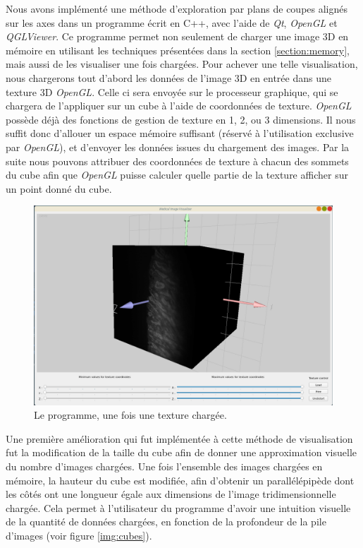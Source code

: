 {{		Nous avons implémenté une méthode d'exploration par plans de coupes alignés sur les axes dans un programme écrit en C++, avec l'aide de \textit{Qt}, \textit{OpenGL} et \textit{QGLViewer}. Ce programme permet non seulement de charger une image 3D en mémoire en utilisant les techniques présentées dans la section \ref{section:memory}, mais aussi de les visualiser une fois chargées. Pour achever une telle visualisation, nous chargerons tout d'abord les données de l'image 3D en entrée dans une texture 3D \textit{OpenGL}. Celle ci sera envoyée sur le processeur graphique, qui se chargera de l'appliquer sur un cube à l'aide de coordonnées de texture. \textit{OpenGL} possède déjà des fonctions de gestion de texture en 1, 2, ou 3 dimensions. Il nous suffit donc d'allouer un espace mémoire suffisant (réservé à l'utilisation exclusive par \textit{OpenGL}), et d'envoyer les données issues du chargement des images. Par la suite nous pouvons attribuer des coordonnées de texture à chacun des sommets du cube afin que \textit{OpenGL} puisse calculer quelle partie de la texture afficher sur un point donné du cube.

		\begin{figure}[!h]
		    \centering
		    \includegraphics[width=.7\linewidth]{img/ui1.png}
		    \caption{Le programme, une fois une texture chargée.}
		    \label{img:ui_general}
		\end{figure}

        Une première amélioration qui fut implémentée à cette méthode de visualisation fut la modification de la taille du cube afin de donner une approximation visuelle du nombre d'images chargées. Une fois l'ensemble des images chargées en mémoire, la hauteur du cube est modifiée, afin d'obtenir un parallélépipède dont les côtés ont une longueur égale aux dimensions de l'image tridimensionnelle chargée. Cela permet à l'utilisateur du programme d'avoir une intuition visuelle de la quantité de données chargées, en fonction de la profondeur de la pile d'images (voir figure \ref{img:cubes}).

}}
